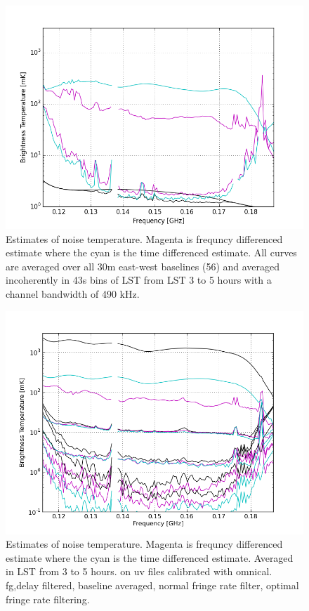 \documentclass[twocolumn,numberedappendix]{emulateapj}
\begin{document}
\begin{figure}[h!]\centering
\includegraphics[width=\columnwidth, height=.8\columnwidth]{plots/noise_t_35.png}
\caption{Estimates of noise temperature. Magenta is frequncy differenced
estimate where the cyan is the time differenced estimate. All curves are
averaged over all 30m east-west baselines (56) and averaged incoherently in 43s
bins of LST from LST 3 to 5 hours with a channel bandwidth of 490 kHz.}
\label{fig:noise_t}
\end{figure}


\begin{figure}[h!]\centering
\includegraphics[width=\columnwidth, height=.8\columnwidth]{plots/noise_vs_fq_plot.png}
\caption{Estimates of noise temperature. Magenta is frequncy differenced
estimate where the cyan is the time differenced estimate. Averaged in LST from 3
to 5 hours. on uv files calibrated with omnical. fg,delay filtered, baseline
averaged, normal fringe rate filter, optimal fringe rate filtering.}
\label{fig:noise_omni_uv}
\end{figure}
\end{document}
